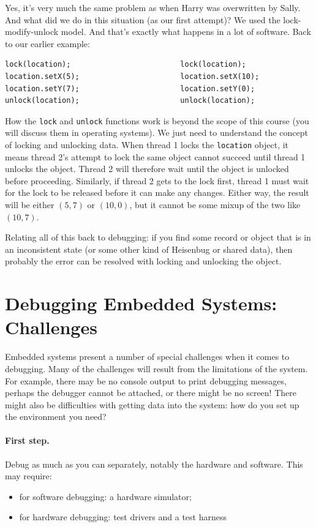 Yes, it's very much the same problem as when Harry was overwritten by Sally. And what did we do in this situation (as our first attempt)? We used the lock-modify-unlock model. And that's exactly what happens in a lot of software. Back to our earlier example:

\begin{verbatim}
lock(location);                         lock(location);
location.setX(5);                       location.setX(10);
location.setY(7);                       location.setY(0);
unlock(location);                       unlock(location);
\end{verbatim}


How the \texttt{lock} and \texttt{unlock} functions work is beyond the scope of this course (you will discuss them in operating systems). We just need to understand the concept of locking and unlocking data. When thread 1 locks the \texttt{location} object, it means thread 2's attempt to lock the same object cannot succeed until thread 1 unlocks the object. Thread 2 will therefore wait until the object is unlocked before proceeding. Similarly, if thread 2 gets to the lock first, thread 1 must wait for the lock to be released before it can make any changes. Either way, the result will be either $(5,7)$ or $(10,0)$, but it cannot be some mixup of the two like $(10, 7)$.

Relating all of this back to debugging: if you find some record or object that is in an inconsistent state (or some other kind of Heisenbug or shared data), then probably the error can be resolved with locking and unlocking the object.

\section*{Debugging Embedded Systems: Challenges}
Embedded systems present a number of special challenges when it comes to debugging. Many of the challenges will result from the limitations of the system. For example, there may be no console output to print debugging messages, perhaps the debugger cannot be attached, or there might be no screen! There might also be difficulties with getting data into the system: how do you set up the environment you need?

\paragraph{First step.} Debug as much as you can separately, notably the
hardware and software. This may require:
\begin{itemize}
\item for software debugging: a hardware simulator;
\item for hardware debugging: test drivers and a test harness
\end{itemize}

